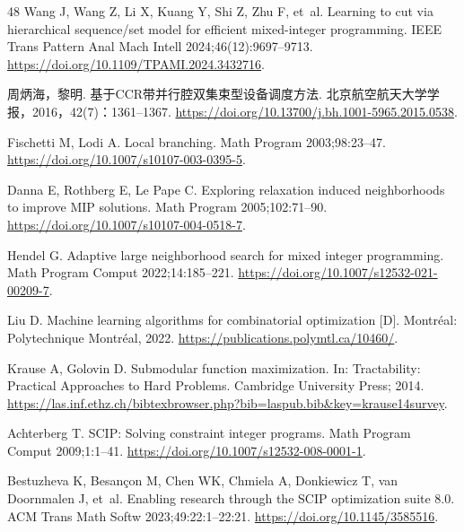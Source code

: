 \begin{thebibliography}{48}
Wang J, Wang Z, Li X, Kuang Y, Shi Z, Zhu F, et~al. Learning to cut via hierarchical sequence/set model for efficient mixed-integer programming.
IEEE Trans Pattern Anal Mach Intell 2024;46(12):9697--9713.
\url{https://doi.org/10.1109/TPAMI.2024.3432716}.

周炳海，黎明. 基于CCR带并行腔双集束型设备调度方法. 北京航空航天大学学报，2016，42(7)：1361--1367.
\url{https://doi.org/10.13700/j.bh.1001-5965.2015.0538}.

Fischetti M, Lodi A. Local branching.
Math Program 2003;98:23--47.
\url{https://doi.org/10.1007/s10107-003-0395-5}.

Danna E, Rothberg E, Le Pape C. Exploring relaxation induced neighborhoods to improve MIP solutions.
Math Program 2005;102:71--90.
\url{https://doi.org/10.1007/s10107-004-0518-7}.

Hendel G. Adaptive large neighborhood search for mixed integer programming.
Math Program Comput 2022;14:185--221.
\url{https://doi.org/10.1007/s12532-021-00209-7}.

Liu D. Machine learning algorithms for combinatorial optimization [D]. Montréal: Polytechnique Montréal, 2022.
\url{https://publications.polymtl.ca/10460/}.

Krause A, Golovin D. Submodular function maximization.
In: Tractability: Practical Approaches to Hard Problems. Cambridge University Press; 2014.
\url{https://las.inf.ethz.ch/bibtexbrowser.php?bib=laspub.bib\&key=krause14survey}.

Achterberg T. {SCIP}: Solving constraint integer programs.
Math Program Comput 2009;1:1--41.
\url{https://doi.org/10.1007/s12532-008-0001-1}.

Bestuzheva K, Besan{\c{c}}on M, Chen WK, Chmiela A, Donkiewicz T, van Doornmalen J, et~al. Enabling research through the {SCIP} optimization suite 8.0.
ACM Trans Math Softw 2023;49:22:1--22:21.
\url{https://doi.org/10.1145/3585516}.

\end{thebibliography}
